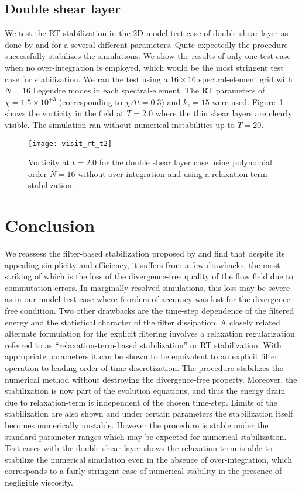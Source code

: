 \subsection{Double shear layer}
We test the RT stabilization in the 2D model test case of double shear layer as done by \cite{fischer01} and \cite{malm13} for a several different parameters. Quite expectedly the procedure successfully stabilizes the simulations. We show the results of only one test case when no over-integration is employed, which would be the most stringent test case for stabilization. We ran the test using a $16\times16$ spectral-element grid with $N=16$ Legendre modes in each spectral-element. The RT parameters of $\chi=1.5\times10^{+3}$ (corresponding to $\chi\Delta t=0.3$) and $k_{c}=15$ were used. Figure~\ref{fig:rt_n15_t2} shows the vorticity in the field at $T=2.0$ where the thin shear layers are clearly visible. The simulation ran without numerical instabilities up to $T=20$.
\begin{figure}[h]
	\centering
	\texttt{[image: visit\_rt\_t2]}
	\caption{\small{Vorticity at $t=2.0$ for the double shear layer case using polynomial order $N=16$ without over-integration and using a relaxation-term stabilization.}}
	\label{fig:rt_n15_t2}
\end{figure}


\section{Conclusion}
We reassess the filter-based stabilization proposed by \cite{fischer01} and find that despite its appealing simplicity and efficiency, it suffers from a few drawbacks, the most striking of which is the loss of the divergence-free quality of the flow field due to commutation errors. In marginally resolved simulations, this loss may be severe as in our model test case where 6 orders of accuracy was lost for the divergence-free condition. Two other drawbacks are the time-step dependence of the filtered energy and the statistical character of the filter dissipation. A closely related alternate formulation for the explicit filtering involves a relaxation regularization referred to as ``relaxation-term-based stabilization'' or RT stabilization. With appropriate parameters it can be shown to be equivalent to an explicit filter operation to leading order of time discretization. The procedure stabilizes the numerical method without destroying the divergence-free property. Moreover, the stabilization is now part of the evolution equations, and thus the energy drain due to relaxation-term is independent of the chosen time-step. Limits of the stabilization are also shown and under certain parameters the stabilization itself becomes numerically unstable. However the procedure is stable under the standard parameter ranges which may be expected for numerical stabilization. Test cases with the double shear layer shows the relaxation-term is able to stabilize the numerical simulation even in the absence of over-integration, which corresponds to a fairly stringent case of numerical stability in the presence of negligible viscosity.




%

%
